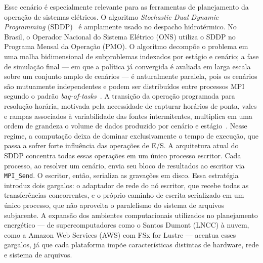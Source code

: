 \documentclass[12pt]{article}
\begin{document}
Esse cenário é especialmente relevante para as ferramentas de planejamento da operação de sistemas elétricos. O algoritmo \textit{Stochastic Dual Dynamic Programming} (SDDP)~\cite{MvLm:91} é amplamente usado no despacho hidrotérmico. No Brasil, o Operador Nacional do Sistema Elétrico (ONS) utiliza o SDDP no Programa Mensal da Operação (PMO). O algoritmo decompõe o problema em uma malha bidimensional de subproblemas indexados por estágio e cenário; a fase de simulação final --- em que a política já convergida é avaliada em larga escala sobre um conjunto amplo de cenários --- é naturalmente paralela, pois os cenários são mutuamente independentes e podem ser distribuídos entre processos MPI segundo o padrão \textit{bag-of-tasks}~\cite{Cirne:2003}. A transição da operação programada para resolução horária, motivada pela necessidade de capturar horários de ponta, vales e rampas associados à variabilidade das fontes intermitentes, multiplica em uma ordem de grandeza o volume de dados produzido por cenário e estágio~\cite{Ajc:10, Ssr:19}. Nesse regime, a computação deixa de dominar exclusivamente o tempo de execução, que passa a sofrer forte influência das operações de E/S. A arquitetura atual do SDDP concentra todas essas operações em um único processo escritor. Cada processo, ao resolver um cenário, envia seu bloco de resultados ao escritor via \texttt{MPI\_Send}. O escritor, então, serializa as gravações em disco. Essa estratégia introduz dois gargalos: o adaptador de rede do nó escritor, que recebe todas as transferências concorrentes, e o próprio caminho de escrita serializado em um único processo, que não aproveita o paralelismo do sistema de arquivos subjacente. A expansão dos ambientes computacionais utilizados no planejamento energético --- de supercomputadores como o Santos Dumont (LNCC) à nuvem, como a Amazon Web Services (AWS) com FSx for Lustre --- acentua esses gargalos, já que cada plataforma impõe características distintas de hardware, rede e sistema de arquivos.
\end{document}

